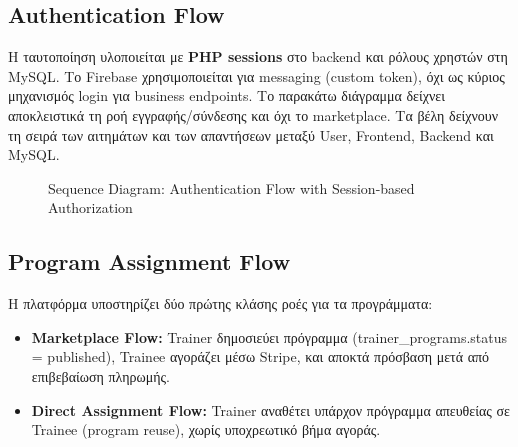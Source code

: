 \documentclass[12pt,a4paper]{report}
\begin{document}
\subsection{Authentication Flow}
Η ταυτοποίηση υλοποιείται με \textbf{PHP sessions} στο backend και ρόλους χρηστών στη MySQL. Το Firebase χρησιμοποιείται για messaging (custom token), όχι ως κύριος μηχανισμός login για business endpoints.
Το παρακάτω διάγραμμα δείχνει αποκλειστικά τη ροή εγγραφής/σύνδεσης και όχι το marketplace. Τα βέλη δείχνουν τη σειρά των αιτημάτων και των απαντήσεων μεταξύ User, Frontend, Backend και MySQL.

\begin{figure}[htbp]
\centering
{}
\caption{Sequence Diagram: Authentication Flow with Session-based Authorization}
\end{figure}

\subsection{Program Assignment Flow}
Η πλατφόρμα υποστηρίζει δύο πρώτης κλάσης ροές για τα προγράμματα:
\begin{itemize}[label=•]
    \item \textbf{Marketplace Flow:} Trainer δημοσιεύει πρόγραμμα (\textenglish{trainer\_programs.status = published}), Trainee αγοράζει μέσω Stripe, και αποκτά πρόσβαση μετά από επιβεβαίωση πληρωμής.
    \item \textbf{Direct Assignment Flow:} Trainer αναθέτει υπάρχον πρόγραμμα απευθείας σε Trainee (program reuse), χωρίς υποχρεωτικό βήμα αγοράς.
\end{itemize}
\end{document}
